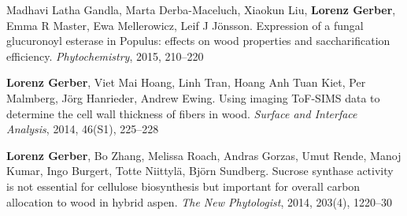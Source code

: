 \documentclass[10pt]{article}
\begin{document}
\begin{bibenum}
                                                                                           \item Madhavi Latha Gandla, Marta Derba-Maceluch, Xiaokun
                                                                                             Liu, \textbf{Lorenz Gerber}, Emma R Master, Ewa Mellerowicz, Leif J
                                                                                             J\"{o}nsson. Expression of a fungal glucuronoyl esterase in Populus:
                                                                                             effects on wood properties and saccharification efficiency.
                                                                                             \textit{Phytochemistry}, 2015, 210--220\\


                                                                                           \item \textbf{Lorenz Gerber}, Viet Mai Hoang, Linh Tran,
                                                                                             Hoang Anh Tuan Kiet, Per Malmberg, J\"{o}rg Hanrieder, Andrew Ewing.
                                                                                             Using imaging ToF-SIMS data to determine the cell wall thickness of
                                                                                             fibers in wood. \textit{Surface and Interface Analysis}, 2014,
                                                                                             46(S1), 225--228\\


                                                                                           \item \textbf{Lorenz Gerber}, Bo Zhang, Melissa Roach,
                                                                                             Andras Gorzas, Umut Rende, Manoj Kumar, Ingo Burgert,
                                                                                             Totte Niittyl\"{a}, Bj\"{o}rn Sundberg. Sucrose synthase
                                                                                             activity is not essential for cellulose biosynthesis but important
                                                                                             for overall carbon allocation to wood in hybrid aspen.
                                                                                             \textit{The New Phytologist}, 2014, 203(4), 1220--30\\


\end{bibenum}
\end{document}
